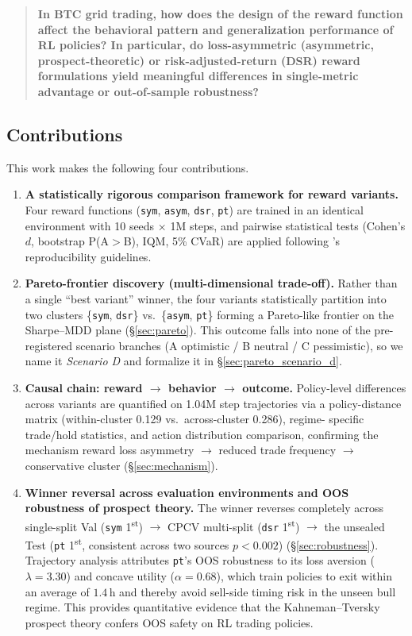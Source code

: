 \documentclass[11pt, a4paper]{article}
\begin{document}
\begin{quote}
\textbf{In BTC grid trading, how does the design of the reward function affect
the behavioral pattern and generalization performance of RL policies? In
particular, do loss-asymmetric (asymmetric, prospect-theoretic) or
risk-adjusted-return (DSR) reward formulations yield meaningful differences in
single-metric advantage or out-of-sample robustness?}
\end{quote}

\subsection{Contributions}
\label{sec:intro_contribution}

This work makes the following four contributions.

\begin{enumerate}[leftmargin=*]
\item \textbf{A statistically rigorous comparison framework for reward variants.}
Four reward functions (\texttt{sym}, \texttt{asym}, \texttt{dsr}, \texttt{pt}) are
trained in an identical environment with 10 seeds $\times$ 1M steps, and pairwise
statistical tests (Cohen's $d$, bootstrap P(A$>$B), IQM, 5\% CVaR) are applied
following \citet{henderson2018rlreproducibility}'s reproducibility guidelines.
\item \textbf{Pareto-frontier discovery (multi-dimensional trade-off).}
Rather than a single ``best variant'' winner, the four variants statistically
partition into two clusters \{\texttt{sym}, \texttt{dsr}\} vs.\
\{\texttt{asym}, \texttt{pt}\} forming a Pareto-like frontier on the
Sharpe--MDD plane (\S\ref{sec:pareto}). This outcome falls into none of the
pre-registered scenario branches (A optimistic / B neutral / C pessimistic),
so we name it \emph{Scenario D} and formalize it in
\S\ref{sec:pareto_scenario_d}.
\item \textbf{Causal chain: reward $\to$ behavior $\to$ outcome.} Policy-level
differences across variants are quantified on 1.04M step trajectories via a
policy-distance matrix (within-cluster 0.129 vs.\ across-cluster 0.286), regime-
specific trade/hold statistics, and action distribution comparison, confirming
the mechanism reward loss asymmetry $\to$ reduced trade frequency $\to$
conservative cluster (\S\ref{sec:mechanism}).
\item \textbf{Winner reversal across evaluation environments and OOS robustness
of prospect theory.} The winner reverses completely across single-split Val
(\texttt{sym} 1\textsuperscript{st}) $\to$ CPCV multi-split
(\texttt{dsr} 1\textsuperscript{st}) $\to$ the unsealed Test
(\texttt{pt} 1\textsuperscript{st}, consistent across two sources $p<0.002$)
(\S\ref{sec:robustness}). Trajectory analysis attributes \texttt{pt}'s OOS
robustness to its loss aversion ($\lambda=3.30$) and concave utility
($\alpha=0.68$), which train policies to exit within an average of $1.4$\,h
and thereby avoid sell-side timing risk in the unseen bull regime. This
provides quantitative evidence that the Kahneman--Tversky prospect theory
\citep{kahneman1979prospect} confers OOS safety on RL trading policies.
\end{enumerate}
\end{document}
